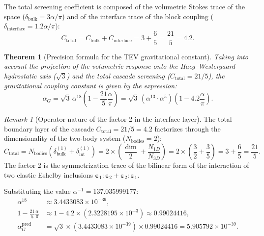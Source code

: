 \documentclass[11pt,a4paper]{article}
\newtheorem{theorem}{Theorem}
\theoremstyle{definition}
\theoremstyle{remark}
\newtheorem{remark}{Remark}
\begin{document}
The total screening coefficient is composed of the volumetric Stokes trace of the space ($\delta_{\mathrm{bulk}} = 3\alpha/\pi$) and of the interface trace of the block coupling ($\delta_{\mathrm{interface}} = 1.2\alpha/\pi$):
\begin{equation}
	C_{\mathrm{total}} = C_{\mathrm{bulk}} + C_{\mathrm{interface}} = 3 + \frac{6}{5} = \frac{21}{5} = 4.2.
	\label{eq:total_screening_twenty_one_fifths}
\end{equation}

\begin{theorem}[Precision formula for the TEV gravitational constant]
	\label{thm:alphaG_exact_formula}
	Taking into account the projection of the volumetric response onto the Haeg--Westergaard hydrostatic axis ($\sqrt{3}$) and the total cascade screening ($C_{\mathrm{total}} = 21/5$), the gravitational coupling constant is given by the expression:
	\begin{equation}
		\alpha_G = \sqrt{3} \, \alpha^{18} \left( 1 - \frac{21}{5}\frac{\alpha}{\pi} \right) = \sqrt{3} \, (\alpha^{13} \cdot \alpha^5) \left( 1 - 4.2 \frac{\alpha}{\pi} \right).
		\label{eq:alphaG_refined_exact_formula}
	\end{equation}
\end{theorem}

\begin{remark}[Operator nature of the factor 2 in the interface layer]
	The total boundary layer of the cascade $C_{\mathrm{total}} = 21/5 = 4.2$ factorizes through the dimensionality of the two-body system ($N_{\mathrm{bodies}} = 2$):
	\begin{equation}
		C_{\mathrm{total}} = N_{\mathrm{bodies}} \left( \delta_{\mathrm{bulk}}^{(1)} + \delta_{\mathrm{int}}^{(1)} \right) = 2 \times \left( \frac{\dim}{2} + \frac{N_{1D}}{N_{3D}} \right) = 2 \times \left( \frac{3}{2} + \frac{3}{5} \right) = 3 + \frac{6}{5} = \frac{21}{5}.
	\end{equation}
	The factor 2 is the symmetrization trace of the bilinear form of the interaction of two elastic Eshelby inclusions $\boldsymbol{\varepsilon}_1 : \boldsymbol{\varepsilon}_2 + \boldsymbol{\varepsilon}_2 : \boldsymbol{\varepsilon}_1$.
\end{remark}

Substituting the value $\alpha^{-1} = 137.035999177$:
\begin{align}
	\alpha^{18} &\approx 3.4433083 \times 10^{-39}, \\
	1 - \frac{21}{5}\frac{\alpha}{\pi} &\approx 1 - 4.2 \times (2.3228195 \times 10^{-3}) \approx 0.99024416, \\
	\alpha_G^{\mathrm{pred}} &= \sqrt{3} \times (3.4433083 \times 10^{-39}) \times 0.99024416 = 5.905792 \times 10^{-39}.
\end{align}
\end{document}
